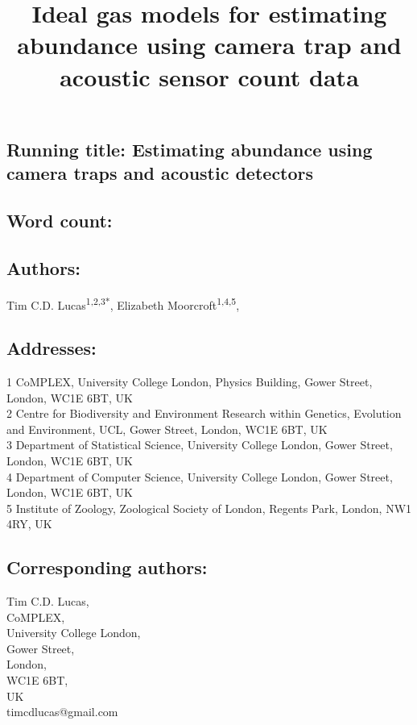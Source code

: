 \documentclass[a4paper,10pt,reqno,oneside]{amsart}
\begin{document}
\title[Estimating abundance using camera traps and acoustic detectors]{Ideal gas models for estimating abundance using camera trap and acoustic sensor count data}
\maketitle

\subsection*{ Running title: Estimating abundance using camera traps and acoustic detectors}

\subsection*{ Word count:}

\subsection*{ Authors:\\}
Tim C.D. Lucas\textsuperscript{1,2,3*}, Elizabeth Moorcroft\textsuperscript{1,4,5}, %


\subsection*{ Addresses:\\}
1 CoMPLEX, University College London, Physics Building, Gower Street, London, WC1E 6BT, UK\\ 
2 Centre for Biodiversity and Environment Research within Genetics, Evolution and Environment, UCL, Gower Street, London, WC1E 6BT, UK\\ 
3 Department of Statistical Science, University College London, Gower Street, London, WC1E 6BT, UK\\ 
4 Department of Computer Science, University College London, Gower Street, London, WC1E 6BT, UK\\ 
5 Institute of Zoology, Zoological Society of London, Regents Park, London, NW1 4RY, UK


\subsection*{ Corresponding authors:\\}
Tim C.D. Lucas,\\
CoMPLEX,\\
University College London,\\
Gower Street,\\
London,\\
WC1E 6BT, \\
UK\\
timcdlucas@gmail.com\\
\end{document}
